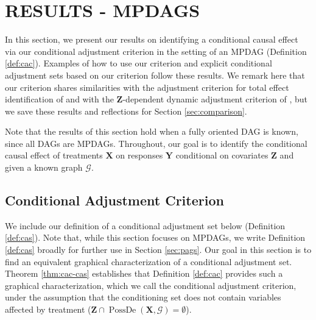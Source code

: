 \documentclass[twoside]{article}
\DeclareMathOperator{\PossDe}{PossDe}
\newcommand{\mb}[1]{\mathbf{#1}}
\newcommand{\g}[1][G]{\mathcal{#1}}
\begin{document}

\section{RESULTS - MPDAGS}
\label{sec:mpdags}

In this section, we present our results on identifying a conditional causal effect via our conditional adjustment criterion in the setting of an MPDAG (Definition \ref{def:cac}). Examples of how to use our criterion and explicit conditional adjustment sets based on our criterion follow these results. We remark here that our criterion shares similarities with the adjustment criterion for total effect identification of \cite{perkovic2017interpreting} and with the $\mb{Z}$-dependent dynamic adjustment criterion of \cite{smucler2020efficient}, but we save these results and reflections for Section \ref{sec:comparison}. 

Note that the results of this section hold when a fully oriented DAG is known, since all DAGs are MPDAGs. Throughout, our goal is to identify the conditional causal effect of treatments $\mb{X}$ on responses $\mb{Y}$ conditional on covariates $\mb{Z}$ and given a known graph $\g$.



\subsection{Conditional Adjustment Criterion}
\label{sec:cond-adj}

We include our definition of a conditional adjustment set below (Definition \ref{def:cas}). Note that, while this section focuses on MPDAGs, we write Definition \ref{def:cas} broadly for further use in Section \ref{sec:pags}. Our goal in this section is to find an equivalent graphical characterization of a conditional adjustment set. Theorem \ref{thm:cac-cas} establishes that Definition \ref{def:cac} provides such a graphical characterization, which we call the conditional adjustment criterion, under the assumption that the conditioning set does not contain variables affected by treatment ($\mb{Z} \cap \PossDe(\mb{X}, \g) = \emptyset$). 
\end{document}
